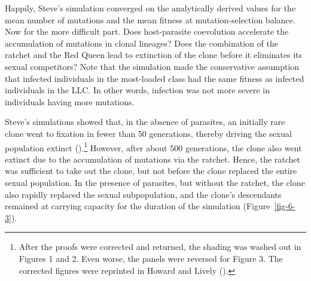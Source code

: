 \documentclass[
  letterpaper,
]{book}
\begin{document}
Happily, Steve's simulation converged on the analytically derived values
for the mean number of mutations and the mean fitness at
mutation-selection balance. Now for the more difficult part. Does
host-parasite coevolution accelerate the accumulation of mutations in
clonal lineages? Does the combination of the ratchet and the Red Queen
lead to extinction of the clone before it eliminates its sexual
competitors? Note that the simulation made the conservative assumption
that infected individuals in the most-loaded class had the same fitness
as infected individuals in the LLC. In other words, infection was not
more severe in individuals having more mutations.

Steve's simulations showed that, in the absence of parasites, an
initially rare clone went to fixation in fewer than 50 generations,
thereby driving the sexual population extinct
().\footnote{After the
  proofs were corrected and returned, the shading was washed out in
  Figures 1 and 2. Even worse, the panels were reversed for Figure 3.
  The corrected figures were reprinted in Howard and Lively
  ().} However, after about 500
generations, the clone also went extinct due to the accumulation of
mutations via the ratchet. Hence, the ratchet was sufficient to take out
the clone, but not before the clone replaced the entire sexual
population. In the presence of parasites, but without the ratchet, the
clone also rapidly replaced the sexual subpopulation, and the clone's
descendants remained at carrying capacity for the duration of the
simulation (Figure~\ref{fig-6-3}).
\end{document}
